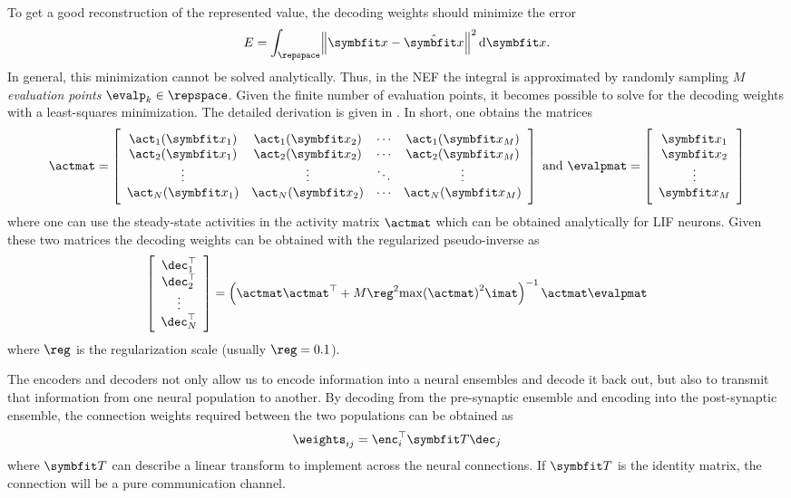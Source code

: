 To get a good reconstruction of the represented value, the decoding weights should minimize the error
\begin{equation}
    E = \int_{\repspace} \norm{\vc x - \hat{\vc x}}^2 \dif \vc x \text{.}
\end{equation}
In general, this minimization cannot be solved analytically.
Thus, in the NEF the integral is approximated by randomly sampling $M$ \emph{evaluation points} $\evalp_k \in \repspace$.
Given the finite number of evaluation points, it becomes possible to solve for the decoding weights with a least-squares minimization.
The detailed derivation is given in \textcite[Ch.~2]{eliasmith2003}.
In short, one obtains the matrices
\begin{equation}
    \actmat = \sbr{\begin{array}{cccc}
            \act_1(\vc x_1) & \act_1(\vc x_2) & \cdots & \act_1(\vc x_M) \\
            \act_2(\vc x_1) & \act_2(\vc x_2) & \cdots & \act_2(\vc x_M) \\
            \vdots & \vdots & \ddots & \vdots \\
            \act_N(\vc x_1) & \act_N(\vc x_2) & \cdots & \act_N(\vc x_M) \\
    \end{array}}
    \ \text{and}\ 
    \evalpmat = \sbr{\begin{array}{c}
            \vc x_1 \\ \vc x_2 \\ \vdots \\ \vc x_M
    \end{array}}
\end{equation}
where one can use the steady-state activities in the activity matrix $\actmat$ which can be obtained analytically for LIF neurons.
Given these two matrices the decoding weights can be obtained with the regularized pseudo-inverse as
\begin{equation}
    \sbr{\begin{array}{c}
            \dec_1\Tr \\ \dec_2\Tr \\ \vdots \\ \dec_N\Tr
        \end{array}} = \del{\actmat \actmat\Tr + M \reg^2 {\max(\actmat)}^2 \imat}^{-1} \actmat \evalpmat
\end{equation}
where $\reg$ is the regularization scale (usually $\reg = 0.1$).

The encoders and decoders not only allow us to encode information into a neural ensembles and decode it back out, but also to transmit that information from one neural population to another.
By decoding from the pre-synaptic ensemble and encoding into the post-synaptic ensemble, the connection weights required between the two populations can be obtained as
\begin{equation}
    \weights_{ij} = \enc_i\Tr \mat T \dec_j
\end{equation}
where $\mat T$ can describe a linear transform to implement across the neural connections.
If $\mat T$ is the identity matrix, the connection will be a pure communication channel.


